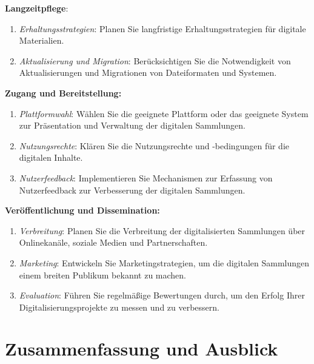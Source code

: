 \documentclass[
  11pt,
  letterpaper,
  DIV=11,
  twoside]{scrreprt}
\begin{document}
\textbf{Langzeitpflege}:

\begin{enumerate}
\def\labelenumi{\arabic{enumi}.}
\setcounter{enumi}{12}
\item
  \emph{Erhaltungsstrategien}: Planen Sie langfristige
  Erhaltungsstrategien für digitale Materialien.
\item
  \emph{Aktualisierung und Migration}: Berücksichtigen Sie die
  Notwendigkeit von Aktualisierungen und Migrationen von Dateiformaten
  und Systemen.
\end{enumerate}

\textbf{Zugang und Bereitstellung:}

\begin{enumerate}
\def\labelenumi{\arabic{enumi}.}
\setcounter{enumi}{14}
\item
  \emph{Plattformwahl}: Wählen Sie die geeignete Plattform oder das
  geeignete System zur Präsentation und Verwaltung der digitalen
  Sammlungen.
\item
  \emph{Nutzungsrechte}: Klären Sie die Nutzungsrechte und -bedingungen
  für die digitalen Inhalte.
\item
  \emph{Nutzerfeedback}: Implementieren Sie Mechanismen zur Erfassung
  von Nutzerfeedback zur Verbesserung der digitalen Sammlungen.
\end{enumerate}

\textbf{Veröffentlichung und Dissemination:}

\begin{enumerate}
\def\labelenumi{\arabic{enumi}.}
\setcounter{enumi}{17}
\item
  \emph{Verbreitung}: Planen Sie die Verbreitung der digitalisierten
  Sammlungen über Onlinekanäle, soziale Medien und Partnerschaften.
\item
  \emph{Marketing}: Entwickeln Sie Marketingstrategien, um die digitalen
  Sammlungen einem breiten Publikum bekannt zu machen.
\item
  \emph{Evaluation}: Führen Sie regelmäßige Bewertungen durch, um den
  Erfolg Ihrer Digitalisierungsprojekte zu messen und zu verbessern.
\end{enumerate}

\section{Zusammenfassung und
Ausblick}\label{zusammenfassung-und-ausblick-4}
\end{document}
